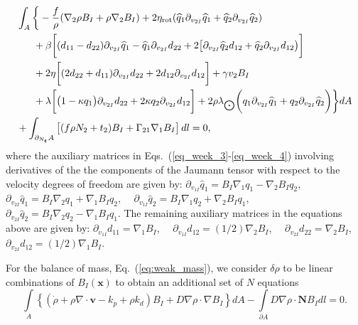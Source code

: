 \begin{align}    \label{eq_week_4}
	&\int_A   \bigg\{ -\frac{f}{\rho} (\nabla_2 \rho B_I +   \rho \nabla_2 B_I )  + 2\eta_{\rm rot} (\widehat{q}_1 \partial_{v_{2I}}\widehat{q}_1 + \widehat{q}_2 \partial_{v_{2I}}\widehat{q}_2 ) \nonumber\\ 
&~~~~~ +  \beta \bigg[ (d_{11} - d_{22})\partial_{v_{2I}}\widehat{q}_1  -\widehat{q}_1\partial_{v_{2I}} d_{22} +     2\big[\partial_{v_{2I}}\widehat{q}_2d_{12} +    \widehat{q}_2\partial_{v_{2I}} d_{12}\big)\bigg] \nonumber\\
& ~~~~~+ 2\eta \bigg[(2d_{22}+   d_{11}) \partial_{v_{2I}} d_{22} +   2d_{12} \partial_{v_{2I}} d_{12}  \bigg]  +\gamma v_2B_I \nonumber  \\ 
& ~~~~~ +        \lambda\bigg[ \big(1 - \kappa q_1\big)   \partial_{v_{2I}} d_{22}  +   2\kappa q_2  \partial_{v_{2I}} d_{12}     \bigg]   \nonumber       + 2\rho \lambda_{\bigodot}\bigg(q_1 \partial_{v_{2I}} \widehat{q}_{1} +   q_2 \partial_{v_{2I}} \widehat{q}_{2}   \bigg) \bigg\}  d A \nonumber
\\ 
&  +    \int_{\partial_{N_{\bm{t}}} A}  \left[ (f \rho N_2 +    t_2)  B_I  + \Gamma_{21} \nabla_1 B_I 	 \right] d l =0,
\end{align}
where the auxiliary matrices in Eqs.~(\ref{eq_week_3}-\ref{eq_week_4}) involving derivatives of the the components of the  Jaumann tensor with respect to the velocity degrees of freedom  are given by: $\partial_{v_{1I}} \widehat{q}_1 =   B_I  \nabla_1 q_{1}  -  \nabla_2 B_I  q_{2}$,~~ $\partial_{v_{2I}} \widehat{q}_1 =   B_I  \nabla_2 q_{1} + \nabla_1 B_I  q_{2}$,~~ $\partial_{v_{1I}} \widehat{q}_2= B_I \nabla_1 q_{2} + \nabla_2 B_I  q_{1}$,~~ $\partial_{v_{2I}} \widehat{q}_2=  B_I  \nabla_2 q_{2}-  \nabla_1 B_I q_{1}$.  The remaining auxiliary matrices in the equations above  are given by: $\partial_{v_{1I}} d_{11}=  \nabla_1 B_I$,~~ $\partial_{v_{1I}} d_{12}=   (1/2) \nabla_2 B_I$,~~ $\partial_{v_{2I}} d_{22}=  \nabla_2 B_I$, $\partial_{v_{2I}} d_{12} =  (1/2) \nabla_1 B_I$. 

For the balance of mass, Eq.~(\ref{eq:weak_mass}), we consider $\delta\rho$ to be linear combinations of $B_I(\bm{x})$ to obtain an additional set of $N$ equations
\begin{equation}
	\label{eq:weak_mass_}
	\underset{ A}{\int} \left \{\left(\dot{\rho}  + \rho \nabla\cdot\bm{v} - k_p +\rho k_d\right)  B_I  + D\nabla \rho \cdot \nabla B_I \right \} dA -   \underset{ \partial A}{\int} D   \nabla \rho  \cdot \bm{N} B_I  dl  = 0.
\end{equation}

